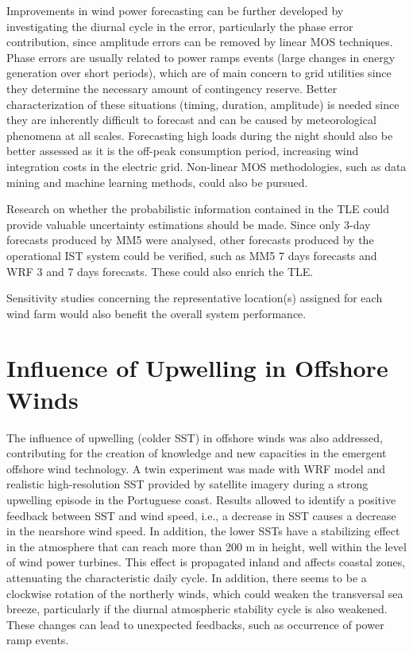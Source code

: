 Improvements in wind power forecasting can be further developed by investigating the diurnal cycle in the error, particularly the phase error contribution, since amplitude errors can be removed by linear MOS techniques. Phase errors are usually related to power ramps events (large changes in energy generation over short periods), which are of main concern to grid utilities since they determine the necessary amount of contingency reserve. Better characterization of these situations (timing, duration, amplitude) is needed since they are inherently difficult to forecast and can be caused by meteorological phenomena at all scales. Forecasting high loads during the night should also be better assessed as it is the off-peak consumption period, increasing wind integration costs in the electric grid. Non-linear MOS methodologies, such as data mining and machine learning methods, could also be pursued. 

Research on whether the probabilistic information contained in the TLE could provide valuable uncertainty estimations should be made. Since only 3-day forecasts produced by MM5 were analysed, other forecasts produced by the operational IST system could be verified, such as MM5 7 days forecasts and WRF 3 and 7 days forecasts. These could also enrich the TLE. 

Sensitivity studies concerning the representative location(s) assigned for each wind farm would also benefit the overall system performance.

\section{Influence of Upwelling in Offshore Winds}

The influence of upwelling (colder SST) in offshore winds was also addressed, contributing for the creation of knowledge and new capacities in the emergent offshore wind technology. A twin experiment was made with WRF model and realistic high-resolution SST provided by satellite imagery during a strong upwelling episode in the Portuguese coast. Results allowed to identify a positive feedback between SST and wind speed, i.e., a decrease in SST causes a decrease in the nearshore wind speed. In addition, the lower SSTs have a stabilizing effect in the atmosphere that can reach more than 200 m in height, well within the level of wind power turbines. This effect is propagated inland and affects coastal zones, attenuating the characteristic daily cycle. In addition, there seems to be a clockwise rotation of the northerly winds, which could weaken the transversal sea breeze, particularly if the diurnal atmospheric stability cycle is also weakened. These changes can lead to unexpected feedbacks, such as occurrence of power ramp events. 

